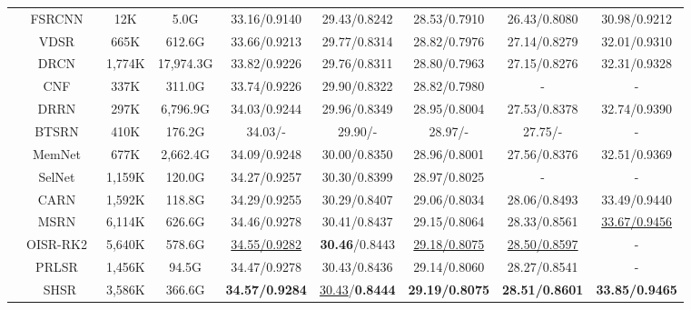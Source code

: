 \documentclass[manuscript,screen]{acmart}
\begin{document}
\begin{table*}[t]
\begin{tabular}{|c|c|c|c|c|c|c|c|c|}
		&FSRCNN~\cite{fsrcnn_eccv2016}&12K&5.0G& 
		33.16/0.9140& 29.43/0.8242& 28.53/0.7910& 26.43/0.8080& 30.98/0.9212\\
		
		&VDSR~\cite{vdsr_cvpr2016}&665K&612.6G& 
		33.66/0.9213& 29.77/0.8314& 28.82/0.7976& 27.14/0.8279& 32.01/0.9310\\
		
		&DRCN~\cite{drcn_cvpr2016}&1,774K&17,974.3G& 
		33.82/0.9226& 29.76/0.8311& 28.80/0.7963& 27.15/0.8276& 32.31/0.9328\\
		
		&CNF~\cite{cnf_cvprw2017}&337K&311.0G& 
		33.74/0.9226& 29.90/0.8322& 28.82/0.7980& - & - \\
		
		&DRRN~\cite{drrn_cvpr2017}&297K&6,796.9G& 
		34.03/0.9244& 29.96/0.8349& 28.95/0.8004& 27.53/0.8378& 32.74/0.9390\\
		
		&BTSRN~\cite{btsrn_cvprw2017}&410K&176.2G& 
		34.03/-& 29.90/-& 28.97/-& 27.75/-& -\\
		
		&MemNet~\cite{memnet_iccv2017}&677K&2,662.4G& 
		34.09/0.9248& 30.00/0.8350& 28.96/0.8001& 27.56/0.8376& 32.51/0.9369 \\
		
		&SelNet~\cite{selnet_cvprw2017}&1,159K&120.0G& 
		34.27/0.9257& 30.30/0.8399& 28.97/0.8025& - &  - \\
		
		&CARN~\cite{carn_eccv2018}&1,592K&118.8G& 
		34.29/0.9255& 30.29/0.8407& 29.06/0.8034& 28.06/0.8493& 33.49/0.9440\\
		
		&MSRN~\cite{msrn_eccv2018}& 6,114K& 626.6G& 
		34.46/0.9278& 30.41/0.8437& 29.15/0.8064& 28.33/0.8561& \underline{33.67/0.9456} \\
		
		&OISR-RK2~\cite{oisr_cvpr2019}& 5,640K& 578.6G&
		\underline{34.55/0.9282}& \textbf{30.46}/0.8443& \underline{29.18/0.8075}& \underline{28.50/0.8597}& -\\
		
		&PRLSR~\cite{prlsr_icassp2020}& 1,456K& 94.5G&
		34.47/0.9278& 30.43/0.8436& 29.14/0.8060& 28.27/0.8541& - \\
		
		&SHSR&3,586K& 366.6G& 
		\textbf{34.57/0.9284}& \underline{30.43}/\textbf{0.8444}& \textbf{29.19/0.8075}& \textbf{28.51/0.8601}& \textbf{33.85/0.9465}  \\
		

\end{tabular}
\end{table*}
\end{document}
